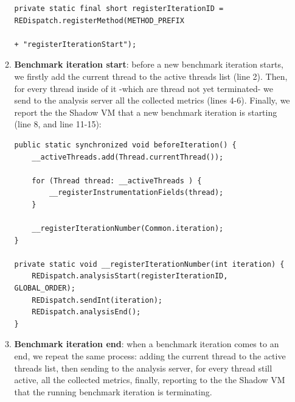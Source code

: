 \documentclass[]{usiinfthesis}
\begin{document}
\begin{itemize}
\begin{enumerate}
        \vspace*{0.25cm}
        \begin{verbatim}
private static final short registerIterationID = REDispatch.registerMethod(METHOD_PREFIX 
                                                                + "registerIterationStart");
    \end{verbatim}
    \vspace*{0.25cm}
    \item \textbf{Benchmark iteration start}: before a new benchmark iteration starts, we firstly add the current thread to the active threads list (line 2). Then, for every thread inside of it -which are thread not yet terminated- we send to the analysis server all the collected metrics (lines 4-6). Finally, we report the the Shadow VM that a new benchmark iteration is starting (line 8, and line 11-15):
    \vspace*{0.25cm}
        \begin{verbatim}
public static synchronized void beforeIteration() {
    __activeThreads.add(Thread.currentThread());

    for (Thread thread: __activeThreads ) {
        __registerInstrumentationFields(thread);
    }

    __registerIterationNumber(Common.iteration);
}

private static void __registerIterationNumber(int iteration) {
    REDispatch.analysisStart(registerIterationID, GLOBAL_ORDER);
    REDispatch.sendInt(iteration);
    REDispatch.analysisEnd();
}
    \end{verbatim}
    \vspace*{0.25cm}
    \item \textbf{Benchmark iteration end}: when a benchmark iteration comes to an end, we repeat the same process: adding the current thread to the active threads list, then sending to the analysis server, for every thread still active, all the collected metrics, finally, reporting to the the Shadow VM that the running benchmark iteration is terminating.
    \end{enumerate}
\end{itemize}


\end{document}
